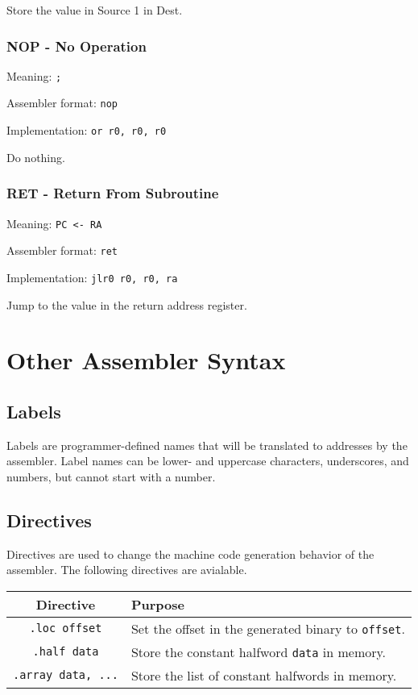 \documentclass{article}
\begin{document}
Store the value in Source 1 in Dest.

\subsubsection{NOP - No Operation}
Meaning: \verb|;|

Assembler format: \verb|nop|

Implementation: \verb|or r0, r0, r0|

Do nothing.

\subsubsection{RET - Return From Subroutine}
Meaning: \verb|PC <- RA|

Assembler format: \verb|ret|

Implementation: \verb|jlr0 r0, r0, ra|

Jump to the value in the return address register.


\section{Other Assembler Syntax}

\subsection{Labels}
Labels are programmer-defined names that will be translated to addresses by the assembler. Label
names can be lower- and uppercase characters, underscores, and numbers, but cannot start with
a number.

\subsection{Directives}
Directives are used to change the machine code generation behavior of the assembler. The following
directives are avialable.

\begin{tabular}{|c|l|}
  Directive & Purpose \\
  \hline
  \verb|.loc offset| & Set the offset in the generated binary to \verb|offset|. \\
  \verb|.half data| & Store the constant halfword \verb|data| in memory. \\
  \verb|.array data, ...| & Store the list of constant halfwords in memory.
\end{tabular}
\end{document}
